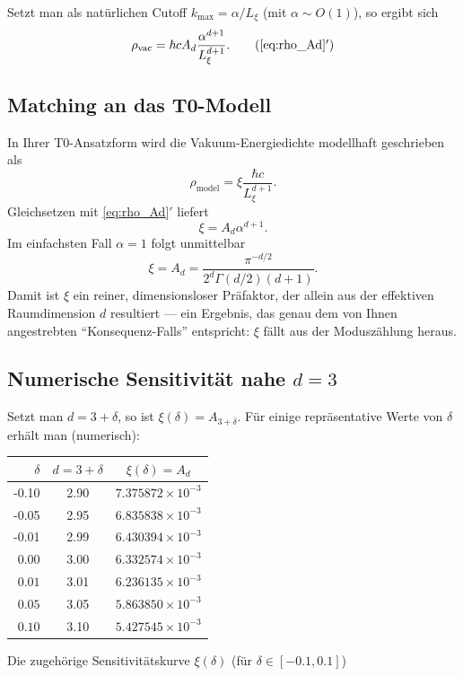 	Setzt man als natürlichen Cutoff \(k_{\max}=\alpha/L_\xi\) (mit \(\alpha\sim O(1)\)), so ergibt sich
	\[
	\rho_{\mathrm{vac}} = \hbar c  A_d  \frac{\alpha^{d+1}}{L_\xi^{d+1}}.
	\tag{\ref{eq:rho_Ad}$'$}
	\]
	
	\subsection{Matching an das T0-Modell}
	In Ihrer T0-Ansatzform wird die Vakuum-Energiedichte modellhaft geschrieben als
	\[
	\rho_{\mathrm{model}}=\xi\frac{\hbar c}{L_\xi^{d+1}}.
	\]
	Gleichsetzen mit \eqref{eq:rho_Ad}$'$ liefert
	\[
	\boxed{\xi = A_d\alpha^{d+1}}.
	\]
	Im einfachsten Fall \(\alpha=1\) folgt unmittelbar
	\[
	\boxed{\xi = A_d = \dfrac{\pi^{-d/2}}{2^d\Gamma(d/2)(d+1)}}.
	\]
	Damit ist \(\xi\) ein reiner, dimensionsloser Präfaktor, der allein aus der effektiven Raumdimension \(d\) resultiert — ein Ergebnis, das genau dem von Ihnen angestrebten ``Konsequenz-Falls'' entspricht: \(\xi\) fällt aus der Moduszählung heraus.
	
	\subsection{Numerische Sensitivität nahe \(d=3\)}
	Setzt man \(d=3+\delta\), so ist \(\xi(\delta)=A_{3+\delta}\). Für einige repräsentative Werte von \(\delta\) erhält man (numerisch):
	\begin{center}
		\begin{tabular}{r c c}
			\toprule
			\(\delta\) & \(d=3+\delta\) & \(\xi(\delta)=A_d\) \\
			\midrule
			-0.10 & 2.90 & \(7.375872\times10^{-3}\) \\
			-0.05 & 2.95 & \(6.835838\times10^{-3}\) \\
			-0.01 & 2.99 & \(6.430394\times10^{-3}\) \\
			\(0.00\) & 3.00 & \(6.332574\times10^{-3}\) \\
			\(0.01\) & 3.01 & \(6.236135\times10^{-3}\) \\
			\(0.05\) & 3.05 & \(5.863850\times10^{-3}\) \\
			\(0.10\) & 3.10 & \(5.427545\times10^{-3}\) \\
			\bottomrule
		\end{tabular}
	\end{center}
	
	Die zugehörige Sensitivitätskurve \(\xi(\delta)\) (für \(\delta\in[-0.1,0.1]\)) 
	
	
